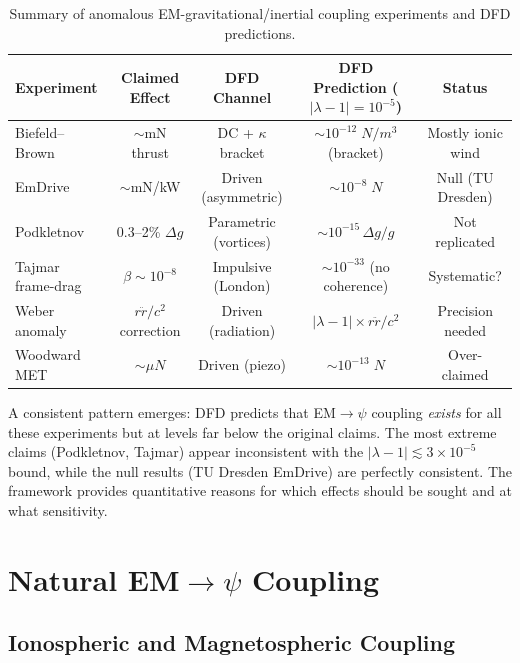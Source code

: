 \documentclass[aps,prd,twocolumn,superscriptaddress,floatfix,nofootinbib]{revtex4-2}
\newcommand{\lam}{\lambda}
\begin{document}
\begin{table}[t]
\caption{Summary of anomalous EM-gravitational/inertial coupling
experiments and DFD predictions.}
\label{tab:anomaly-summary}
\begin{ruledtabular}
\begin{tabular}{lcccc}
Experiment & Claimed Effect & DFD Channel &
DFD Prediction ($|\lam-1| = 10^{-5}$) & Status \\
\hline
Biefeld--Brown & $\sim$mN thrust & DC + $\kappa$ bracket &
$\sim 10^{-12}\;\si{N/m^3}$ (bracket) & Mostly ionic wind \\
EmDrive & $\sim$mN/kW & Driven (asymmetric) &
$\sim 10^{-8}\;\si{N}$ & Null (TU Dresden) \\
Podkletnov & 0.3--2\% $\Delta g$ & Parametric (vortices) &
$\sim 10^{-15}\,\Delta g/g$ & Not replicated \\
Tajmar frame-drag & $\beta \sim 10^{-8}$ & Impulsive (London) &
$\sim 10^{-33}$ (no coherence) & Systematic? \\
Weber anomaly & $r\ddot{r}/c^2$ correction & Driven (radiation) &
$|\lam-1| \times r\ddot{r}/c^2$ & Precision needed \\
Woodward MET & $\sim\si{\mu N}$ & Driven (piezo) &
$\sim 10^{-13}\;\si{N}$ & Over-claimed \\
\end{tabular}
\end{ruledtabular}
\end{table}

A consistent pattern emerges: DFD predicts that EM$\to\psi$ coupling
\emph{exists} for all these experiments but at levels far below the
original claims. The most extreme claims (Podkletnov, Tajmar) appear
inconsistent with the $|\lam-1| \lesssim 3 \times 10^{-5}$ bound,
while the null results (TU Dresden EmDrive) are perfectly consistent.
The framework provides quantitative reasons for which effects should
be sought and at what sensitivity.

\section{Natural EM$\to\psi$ Coupling}\label{sec:natural}

\subsection{Ionospheric and Magnetospheric Coupling}
\end{document}
